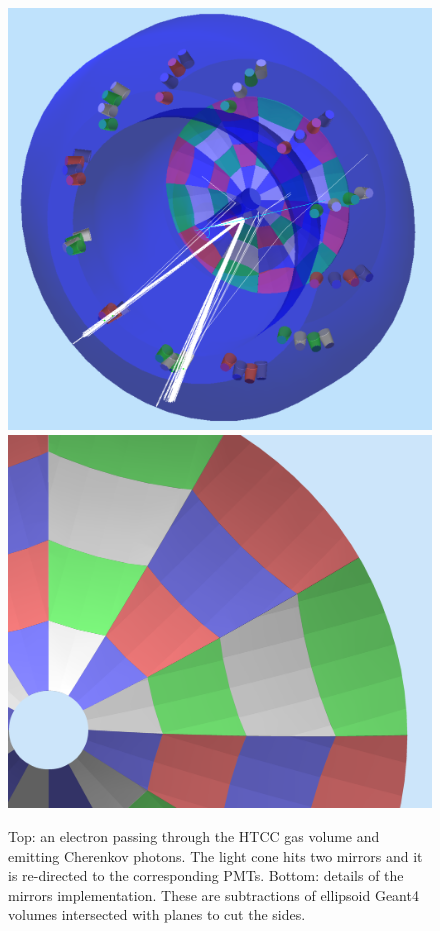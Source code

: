 \begin{figure}
	\centering
	\includegraphics[width=0.95\columnwidth,keepaspectratio]{img/htccGeometry.png}
	\includegraphics[width=0.95\columnwidth,keepaspectratio]{img/htccDetail.png}
	\caption{Top: an electron passing through the HTCC gas volume and emitting Cherenkov photons. The light cone
            hits two mirrors and it is re-directed to the corresponding PMTs.
            Bottom: details of the mirrors implementation. These are subtractions of ellipsoid Geant4 volumes intersected
            with planes to cut the sides. }
	\label{fig:htccGeometry}
\end{figure}


